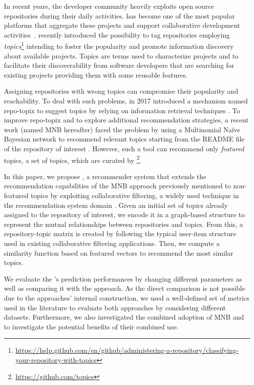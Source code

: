 In recent years, the developer community heavily exploits open source 
repositories during their daily activities. \GH has become one of the most
popular platforms that aggregate these projects and support collaborative 
development activities~\cite{7832894}. \GH recently introduced the possibility 
to tag repositories employing 
\emph{topics}\footnote{\url{https://help.github.com/en/github/administering-a-repository/classifying-your-repository-with-topics}}
 intending to foster the popularity and promote information discovery about 
available projects. Topics are terms used to characterize projects and to 
facilitate their discoverability from software developers that are searching 
for existing projects providing them with some reusable features. 

Assigning repositories with wrong topics can compromise their popularity and 
reachability. To deal with such problems, in 2017 \GH introduced a 
mechanism named repo-topix to suggest topics by relying on information 
retrieval techniques \cite{repo-topix}. To improve repo-topix 
and to explore additional recommendation strategies, a recent work (named MNB 
hereafter) faced the problem by using a Multinomial Na\"ive Bayesian network to 
recommend relevant topics starting from the README file of the repository of 
interest \cite{10.1145/3383219.3383227}. However, such a tool can recommend 
only \emph{featured} topics, \ie a set of topics, which are curated by 
\GH\footnote{\url{https://github.com/topics}}.


In this paper, we propose \CT, a recommender system that extends the 
recommendation capabilities of the MNB approach previously mentioned to 
non-featured topics by exploiting collaborative filtering, a widely used 
technique in the recommendation system domain 
\cite{Schafer:2007:CFR:1768197.1768208}. Given an initial set of topics already 
assigned to the \GH repository of interest, we encode it in a graph-based 
structure to represent the mutual relationships between repositories and 
topics. From this, a repository-topic matrix is created by following the 
typical user-item structure used in existing collaborative filtering 
applications. Then, we compute a similarity function based on featured vectors 
to recommend the most similar topics.

We evaluate the \CT's prediction performances by changing different parameters 
as well as comparing it with the \MNB approach. As the direct comparison is not 
possible due to the approaches' internal construction, we used a well-defined 
set of metrics used in the literature to evaluate both approaches by 
considering different datasets. Furthermore, we also investigated the combined 
adoption of MNB and \TF to investigate the potential benefits of their combined 
use. 

